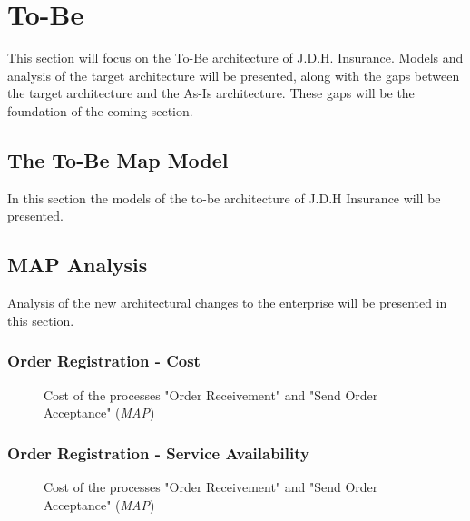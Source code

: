 \section{To-Be}
\label{sec:to_be}
This section will focus on the To-Be architecture of J.D.H. Insurance. Models and analysis of the target architecture will be presented, along with the gaps between the target architecture and the As-Is architecture. These gaps will be the foundation of the coming section.
%
\subsection{The To-Be Map Model}
\label{sec:models_to_be}
In this section the models of the to-be architecture of J.D.H Insurance will be presented.
%
\subsection{MAP Analysis}
\label{sec:map_analysis_to_be}
Analysis of the new architectural changes to the enterprise will be presented in this section.
%
\subsubsection{Order Registration - Cost}
\label{sec:order_analysis}
\begin{center}
	\begin{figure}[H]
		\centering
		\setlength\fboxsep{7pt}
		\setlength\fboxrule{0.5pt}
		\caption{Cost of the processes "Order Receivement" and "Send Order Acceptance" (\emph{MAP})}
		\label{fig:map_order_cost_to_be}
	\end{figure}
\end{center}

%
\subsubsection{Order Registration - Service Availability}
\label{sec:order_availability_to_be}
\begin{center}
	\begin{figure}[H]
		\centering
		\setlength\fboxsep{7pt}
		\setlength\fboxrule{0.5pt}
		\caption{Cost of the processes "Order Receivement" and "Send Order Acceptance" (\emph{MAP})}
		\label{fig:map_order_availability_to_be}
	\end{figure}
\end{center}


